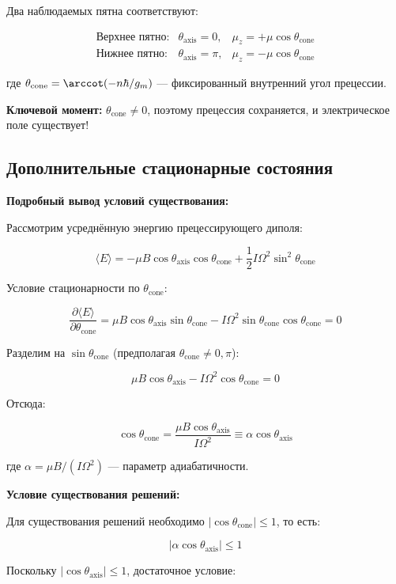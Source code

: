 \documentclass[12pt]{article}
\begin{document}
Два наблюдаемых пятна соответствуют:

\[
\begin{array}{lll}
\text{Верхнее пятно:} & \theta_{\text{axis}} = 0, & \mu_z = +\mu \cos\theta_{\text{cone}} \\
\text{Нижнее пятно:} & \theta_{\text{axis}} = \pi, & \mu_z = -\mu \cos\theta_{\text{cone}}
\end{array}
\]

где $\theta_{\text{cone}} = \arccot(-n\hbar/g_m)$ — фиксированный внутренний угол прецессии.

\textbf{Ключевой момент:} $\theta_{\text{cone}} \neq 0$, поэтому прецессия сохраняется, и электрическое поле существует!

\subsection{Дополнительные стационарные состояния}

\textbf{Подробный вывод условий существования:}

Рассмотрим усреднённую энергию прецессирующего диполя:

\[
\langle E \rangle = -\mu B \cos\theta_{\text{axis}} \cos\theta_{\text{cone}} + \frac{1}{2} I \Omega^2 \sin^2\theta_{\text{cone}}
\]

Условие стационарности по $\theta_{\text{cone}}$:

\[
\frac{\partial \langle E \rangle}{\partial \theta_{\text{cone}}} = \mu B \cos\theta_{\text{axis}} \sin\theta_{\text{cone}} - I \Omega^2 \sin\theta_{\text{cone}} \cos\theta_{\text{cone}} = 0
\]

Разделим на $\sin\theta_{\text{cone}}$ (предполагая $\theta_{\text{cone}} \neq 0, \pi$):

\[
\mu B \cos\theta_{\text{axis}} - I \Omega^2 \cos\theta_{\text{cone}} = 0
\]

Отсюда:

\[
\cos\theta_{\text{cone}} = \frac{\mu B \cos\theta_{\text{axis}}}{I \Omega^2} \equiv \alpha \cos\theta_{\text{axis}}
\]

где $\alpha = \mu B / (I \Omega^2)$ — параметр адиабатичности.

\textbf{Условие существования решений:}

Для существования решений необходимо $|\cos\theta_{\text{cone}}| \leq 1$, то есть:

\[
|\alpha \cos\theta_{\text{axis}}| \leq 1
\]

Поскольку $|\cos\theta_{\text{axis}}| \leq 1$, достаточное условие:
\end{document}
